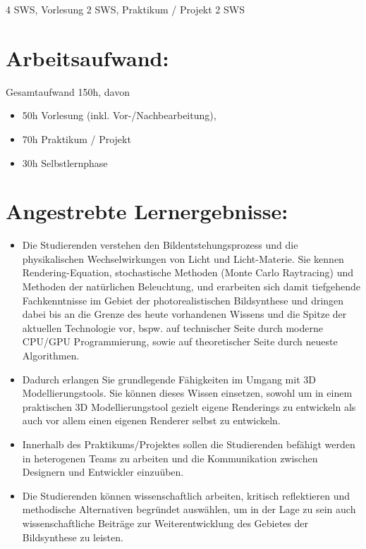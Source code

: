 4 SWS, Vorlesung 2 SWS, Praktikum / Projekt 2 SWS

\section*{Arbeitsaufwand:}\label{arbeitsaufwand-22}

Gesamtaufwand 150h, davon

\begin{itemize}
\item
  50h Vorlesung (inkl. Vor-/Nachbearbeitung),
\item
  70h Praktikum / Projekt
\item
  30h Selbstlernphase
\end{itemize}

\section*{Angestrebte
Lernergebnisse:}\label{angestrebte-lernergebnisse-22}

\begin{itemize}
\item
  Die Studierenden verstehen den Bildentstehungsprozess und die
  physikalischen Wechselwirkungen von Licht und Licht-Materie. Sie
  kennen Rendering-Equation, stochastische Methoden (Monte Carlo
  Raytracing) und Methoden der natürlichen Beleuchtung, und erarbeiten
  sich damit tiefgehende Fachkenntnisse im Gebiet der photorealistischen
  Bildsynthese und dringen dabei bis an die Grenze des heute vorhandenen
  Wissens und die Spitze der aktuellen Technologie vor, bspw. auf
  technischer Seite durch moderne CPU/GPU Programmierung, sowie auf
  theoretischer Seite durch neueste Algorithmen.
\item
  Dadurch erlangen Sie grundlegende Fähigkeiten im Umgang mit 3D
  Modellierungstools. Sie können dieses Wissen einsetzen, sowohl um in
  einem praktischen 3D Modellierungstool gezielt eigene Renderings zu
  entwickeln als auch vor allem einen eigenen Renderer selbst zu
  entwickeln.
\item
  Innerhalb des Praktikums/Projektes sollen die Studierenden befähigt
  werden in heterogenen Teams zu arbeiten und die Kommunikation zwischen
  Designern und Entwickler einzuüben.
\item
  Die Studierenden können wissenschaftlich arbeiten, kritisch
  reflektieren und methodische Alternativen begründet auswählen, um in
  der Lage zu sein auch wissenschaftliche Beiträge zur Weiterentwicklung
  des Gebietes der Bildsynthese zu leisten.
\end{itemize}

